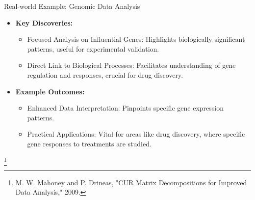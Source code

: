 \documentclass[pdf]{beamer}
\begin{document}
\begin{frame}{Real-world Example: Genomic Data Analysis}
    \begin{itemize}
        \item \textbf{Key Discoveries:}
        \begin{itemize}
            \item Focused Analysis on Influential Genes: Highlights biologically significant patterns, useful for experimental validation.
            \item Direct Link to Biological Processes: Facilitates understanding of gene regulation and responses, crucial for drug discovery.
        \end{itemize}
        \item \textbf{Example Outcomes:}
        \begin{itemize}
            \item Enhanced Data Interpretation: Pinpoints specific gene expression patterns.
            \item Practical Applications: Vital for areas like drug discovery, where specific gene responses to treatments are studied.
        \end{itemize}
    \end{itemize}
    \footnote{M. W. Mahoney and P. Drineas, "CUR Matrix Decompositions for Improved Data Analysis," 2009.}
\end{frame}
\end{document}
